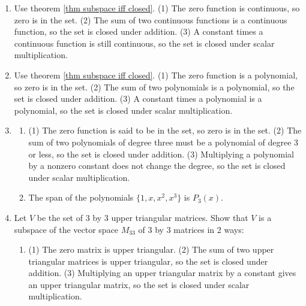 {\begin{multicols}{2}
\begin{enumerate}
\begin{enumerate}
	\item Use theorem \ref{thm subspace iff closed}.
	(1) The zero function is continuous, so zero is in the set. 
	(2) The sum of two continuous functions is a continuous function, so the set is closed under addition.
	(3) A constant times a continuous function is still continuous, so the set is closed under scalar multiplication.
	
	\item Use theorem \ref{thm subspace iff closed}.
	(1) The zero function is a polynomial, so zero is in the set. 
	(2) The sum of two polynomials is a polynomial, so the set is closed under addition.
	(3) A constant times a polynomial is a polynomial, so the set is closed under scalar multiplication.
	
	
	\item 
\begin{enumerate}
	\item 
	(1) The zero function is said to be in the set, so zero is in the set. 
	(2) The sum of two polynomials of degree three must be a polynomial of degree 3 or less, so the set is closed under addition.
	(3) Multiplying a polynomial by a nonzero constant does not change the degree, so the set is closed under scalar multiplication.

	\item The span of the polynomials $\{1,x,x^2,x^3\}$ is $P_3(x)$.  
\end{enumerate}

	\item Let $V$ be the set of 3 by 3 upper triangular matrices.  Show that $V$ is a subspace of the vector space $M_{33}$ of 3 by 3 matrices in 2 ways:
\begin{enumerate}
	\item 
	(1) The zero matrix is upper triangular. 
	(2) The sum of two upper triangular matrices is upper triangular, so the set is closed under addition.
	(3) Multiplying an upper triangular matrix by a constant gives an upper triangular matrix, so the set is closed under scalar multiplication.


\end{enumerate}
\end{enumerate}
\end{enumerate}
\end{multicols}}
